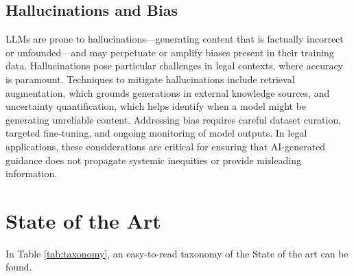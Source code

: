 \subsection{Hallucinations and Bias}
LLMs are prone to hallucinations—generating content that is factually incorrect 
or unfounded—and may perpetuate or amplify biases present in their training data. 
Hallucinations pose particular challenges in legal contexts, where accuracy is 
paramount. Techniques to mitigate hallucinations include retrieval augmentation, 
which grounds generations in external knowledge sources, and uncertainty 
quantification, which helps identify when a model might be generating unreliable 
content. Addressing bias requires careful dataset curation, targeted fine-tuning, 
and ongoing monitoring of model outputs. In legal applications, these considerations 
are critical for ensuring that AI-generated guidance does not propagate systemic 
inequities or provide misleading information.

\section{State of the Art}
In Table \ref{tab:taxonomy}, an easy-to-read taxonomy of the State of the art can be found.

